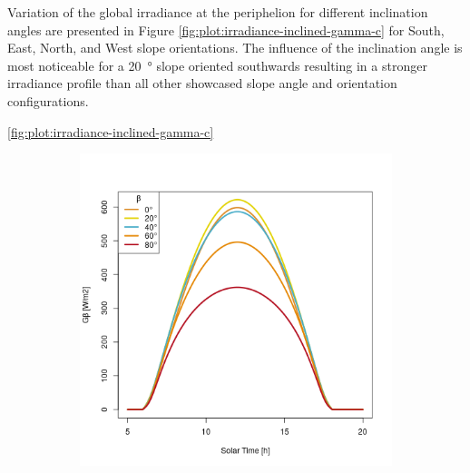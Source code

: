 Variation of the global irradiance at the periphelion for different inclination angles are presented in Figure \ref{fig:plot:irradiance-inclined-gamma-c} for South, East, North, and West slope orientations. The influence of the inclination angle is most noticeable for a \SI{20}{\degree} slope oriented southwards resulting in a stronger irradiance profile than all other showcased slope angle and orientation configurations.

\ref{fig:plot:irradiance-inclined-gamma-c}

\begin{figure}[H]
\vspace{-2ex}
	\centering
    \setlength{\subfigureWidth}{0.50\textwidth}
    \setlength{\graphicsHeight}{80mm}
    \hypersetup{hidelinks=true}%
  	\begin{subfigure}[t]{\subfigureWidth}
      \centering
  		\includegraphics[height=\graphicsHeight]{sections/martian-environment/plots/diurnal-irradiance-slope-angle-variation-1-for-ls-248-phi-2-tau-05-and-gammac-0.png}
  		\label{fig:sub:irradiance-inclined-gamma-c-0}
  	\end{subfigure}\hfill
    \begin{subfigure}[t]{\subfigureWidth}
      \centering

\end{subfigure}
\end{figure}
